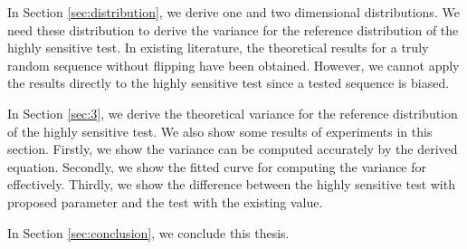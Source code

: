 \par
In Section \ref{sec:distribution}, we derive one and two dimensional distributions. We need these distribution to derive the variance for the reference distribution of the highly sensitive test. In existing literature, the theoretical results for a truly random sequence without flipping have been obtained. However, we cannot apply the results directly to the highly sensitive test since a tested sequence is biased.
%
% 
\par
In Section \ref{sec:3}, we derive the theoretical variance for the reference distribution of the highly sensitive test. 
%
We also show some results of experiments in this section. 
Firstly, we show the variance can be computed accurately by the derived equation. 
Secondly, we show the fitted curve for computing the variance for effectively. 
Thirdly, we show the difference between the highly sensitive test with proposed parameter and the test with the existing value. 
%
\par
In Section \ref{sec:conclusion}, we conclude this thesis.